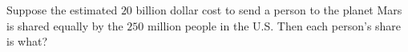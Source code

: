 Suppose the estimated $20$ billion dollar cost to send a person to the planet Mars is shared equally by the $250$ million people in the U.S. Then each person's share is what?
